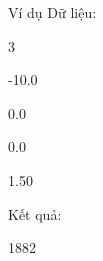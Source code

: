 Ví dụ
Dữ liệu:  

   3   


   -10.0   


   0.0   


   0.0   


   1.50   







   Kết quả:  

   1882